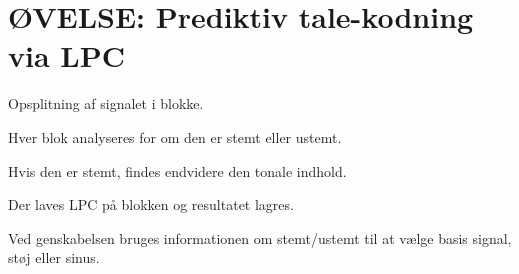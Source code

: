 \newpage
\section{ØVELSE: Prediktiv tale-kodning via LPC}
\textit{}

Opsplitning af signalet i blokke.

Hver blok analyseres for om den er stemt eller ustemt.

Hvis den er stemt, findes endvidere den tonale indhold.

Der laves LPC på blokken og resultatet lagres.

Ved genskabelsen bruges informationen om stemt/ustemt til at vælge
basis signal, støj eller sinus.
